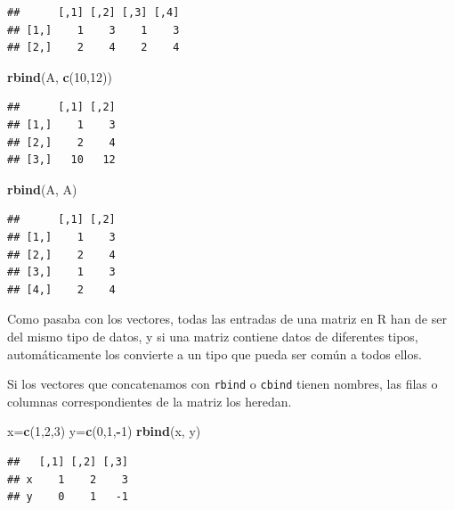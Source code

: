 \documentclass[]{book}
\newenvironment{Shaded}{\begin{snugshade}}{\end{snugshade}}
\newcommand{\DecValTok}[1]{\textcolor[rgb]{0.00,0.00,0.81}{#1}}
\newcommand{\KeywordTok}[1]{\textcolor[rgb]{0.13,0.29,0.53}{\textbf{#1}}}
\newcommand{\NormalTok}[1]{#1}
\newcommand{\OperatorTok}[1]{\textcolor[rgb]{0.81,0.36,0.00}{\textbf{#1}}}
\theoremstyle{definition}
\theoremstyle{definition}
\theoremstyle{definition}
\theoremstyle{remark}
\begin{document}
\begin{verbatim}
##      [,1] [,2] [,3] [,4]
## [1,]    1    3    1    3
## [2,]    2    4    2    4
\end{verbatim}

\begin{Shaded}
\begin{Highlighting}[]
\KeywordTok{rbind}\NormalTok{(A, }\KeywordTok{c}\NormalTok{(}\DecValTok{10}\NormalTok{,}\DecValTok{12}\NormalTok{))}
\end{Highlighting}
\end{Shaded}

\begin{verbatim}
##      [,1] [,2]
## [1,]    1    3
## [2,]    2    4
## [3,]   10   12
\end{verbatim}

\begin{Shaded}
\begin{Highlighting}[]
\KeywordTok{rbind}\NormalTok{(A, A)}
\end{Highlighting}
\end{Shaded}

\begin{verbatim}
##      [,1] [,2]
## [1,]    1    3
## [2,]    2    4
## [3,]    1    3
## [4,]    2    4
\end{verbatim}

Como pasaba con los vectores, todas las entradas de una matriz en R han de ser del mismo tipo de datos, y si una matriz contiene datos de diferentes tipos, automáticamente los convierte a un tipo que pueda ser común a todos ellos.

Si los vectores que concatenamos con \texttt{rbind} o \texttt{cbind} tienen nombres, las filas o columnas correspondientes de la matriz los heredan.

\begin{Shaded}
\begin{Highlighting}[]
\NormalTok{x=}\KeywordTok{c}\NormalTok{(}\DecValTok{1}\NormalTok{,}\DecValTok{2}\NormalTok{,}\DecValTok{3}\NormalTok{)}
\NormalTok{y=}\KeywordTok{c}\NormalTok{(}\DecValTok{0}\NormalTok{,}\DecValTok{1}\NormalTok{,}\OperatorTok{-}\DecValTok{1}\NormalTok{)}
\KeywordTok{rbind}\NormalTok{(x, y)}
\end{Highlighting}
\end{Shaded}

\begin{verbatim}
##   [,1] [,2] [,3]
## x    1    2    3
## y    0    1   -1
\end{verbatim}
\end{document}
